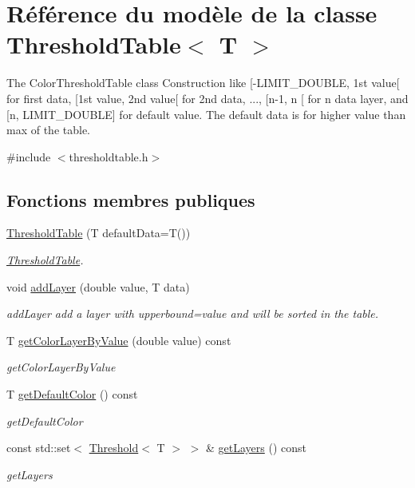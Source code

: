 \hypertarget{class_threshold_table}{}\section{Référence du modèle de la classe Threshold\+Table$<$ T $>$}
\label{class_threshold_table}


The Color\+Threshold\+Table class Construction like \mbox{[}-\/\+L\+I\+M\+I\+T\+\_\+\+D\+O\+U\+B\+LE, 1st value\mbox{[} for first data, \mbox{[}1st value, 2nd value\mbox{[} for 2nd data, ..., \mbox{[}n-\/1, n \mbox{[} for n data layer, and \mbox{[}n, L\+I\+M\+I\+T\+\_\+\+D\+O\+U\+B\+LE\mbox{]} for default value. The default data is for higher value than max of the table.  




{\ttfamily \#include $<$thresholdtable.\+h$>$}

\subsection*{Fonctions membres publiques}
\begin{DoxyCompactItemize}
\item 
\hyperlink{class_threshold_table_aed8c318959eca9a7f33944a8300b3e6a}{Threshold\+Table} (T default\+Data=T())
\begin{DoxyCompactList}\small\item\em \hyperlink{class_threshold_table}{Threshold\+Table}. \end{DoxyCompactList}\item 
void \hyperlink{class_threshold_table_a8724b07d34b3b1c84d4e6e6f2afdad37}{add\+Layer} (double value, T data)
\begin{DoxyCompactList}\small\item\em add\+Layer add a layer with upperbound=value and will be sorted in the table. \end{DoxyCompactList}\item 
T \hyperlink{class_threshold_table_a35e7219d9476c3a5c0362e80ab7f5596}{get\+Color\+Layer\+By\+Value} (double value) const
\begin{DoxyCompactList}\small\item\em get\+Color\+Layer\+By\+Value \end{DoxyCompactList}\item 
T \hyperlink{class_threshold_table_ac20ccb2dd4cd20e96036818ca0106f93}{get\+Default\+Color} () const
\begin{DoxyCompactList}\small\item\em get\+Default\+Color \end{DoxyCompactList}\item 
const std\+::set$<$ \hyperlink{struct_threshold}{Threshold}$<$ T $>$ $>$ \& \hyperlink{class_threshold_table_a6cb1745a571a4e071e9b74ad34372405}{get\+Layers} () const
\begin{DoxyCompactList}\small\item\em get\+Layers \end{DoxyCompactList}\end{DoxyCompactItemize}


